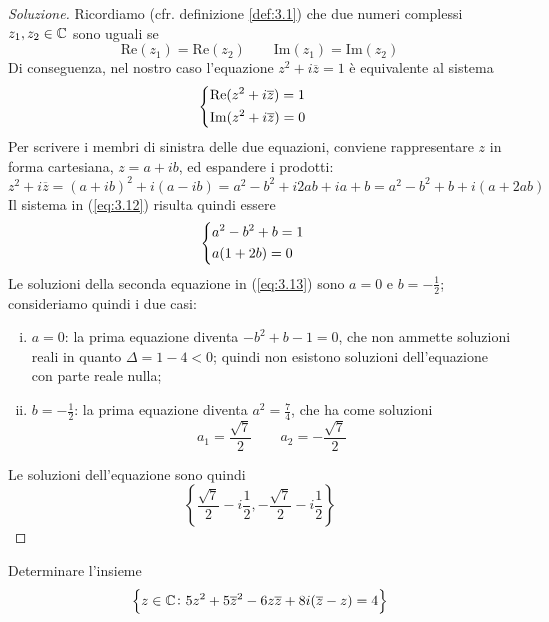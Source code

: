 \begin{proof}[Soluzione]
    Ricordiamo (cfr. definizione \ref{def:3.1}) che due numeri complessi $z_1, z_2 \in\amsbb{C}$ sono uguali se
    \[
    \mathrm{Re}(z_1) = \mathrm{Re}(z_2) \qquad \mathrm{Im}(z_1) = \mathrm{Im}(z_2) 
    \]
    Di conseguenza, nel nostro caso l'equazione $z^2+i\overline{z}=1$ è equivalente al sistema
    \begin{equation}
        \label{eq:3.12}
        \begin{dcases}
        \mathrm{Re}(z^2+i\overline{z})= 1&\\
        \mathrm{Im}(z^2+i\overline{z})= 0&  
    \end{dcases}
    \end{equation}
    Per scrivere i membri di sinistra delle due equazioni, conviene rappresentare $z$ in forma cartesiana, $z=a+ib$, ed espandere i prodotti:
    \[
    z^2 + i \overline{z} = (a+ib)^2 + i(a-ib) = a^2-b^2 + i2ab +ia+b = a^2-b^2+b + i(a+2ab)
    \]
    Il sistema in (\ref{eq:3.12}) risulta quindi essere
    \begin{equation}
        \label{eq:3.13}
        \begin{dcases}
        a^2-b^2+b= 1&\\
        a(1+2b)= 0
    \end{dcases}
    \end{equation}
    Le soluzioni della seconda equazione in (\ref{eq:3.13}) sono $a=0$ e $b=-\frac{1}{2}$; consideriamo quindi i due casi:
    \begin{enumerate}[(i)]
        \item $a=0$: la prima equazione diventa $-b^2 +b-1=0$, che non ammette soluzioni reali in quanto $\Delta = 1-4<0$; quindi non esistono soluzioni dell'equazione con parte reale nulla;
        \item $b=-\frac{1}{2}$: la prima equazione diventa $a^2 =\frac{7}{4}$, che ha come soluzioni
        \[
        a_1 = \frac{\sqrt{7}}{2} \qquad a_2 = -\frac{\sqrt{7}}{2}
        \]
    \end{enumerate}
    Le soluzioni dell'equazione sono quindi
    \[
    \left\{\frac{\sqrt{7}}{2}-i\frac{1}{2}, -\frac{\sqrt{7}}{2}-i\frac{1}{2}\right\}
    \]
\end{proof}
\begin{exercise}
    \label{ex:3.5}
    Determinare l'insieme
    \[
    \left\{z\in\amsbb{C} \colon 5z^2+5\overline{z}^2-6z\overline{z}+8i(\overline{z}-z) = 4\right\}
    \]
\end{exercise}
